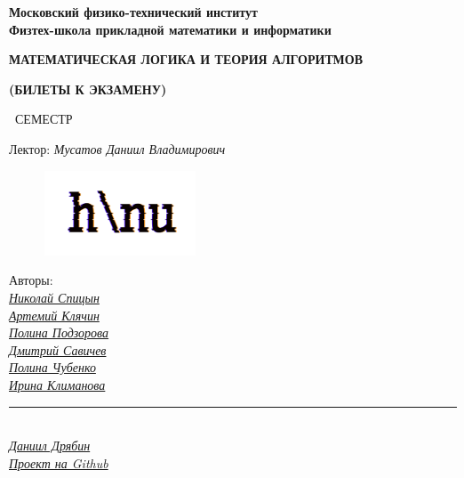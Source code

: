 
\newcommand{\GithubLink}{https://github.com/MIPT-Group/Lectures_Tex_Club}

\begin{titlepage}
	\clearpage\thispagestyle{empty}
	\centering
	
	
	\textbf{Московский физико-технический институт \\ Физтех-школа прикладной математики и информатики}
	\vspace{20ex}
	\vspace{13ex}
	
	{\textbf{{МАТЕМАТИЧЕСКАЯ ЛОГИКА И ТЕОРИЯ АЛГОРИТМОВ}}}

	{\textbf{(БИЛЕТЫ К ЭКЗАМЕНУ)}}
	
	\SemesterNumber\ СЕМЕСТР  
	\vspace{3ex}
	
	Лектор: \textit{Мусатов Даниил Владимирович}
	
	\begin{figure}[!ht]
		\centering
		\includegraphics[width=0.4\textwidth]{images/logo_ltc.png}
	\end{figure}

	\begin{flushright}
		\noindent
		Авторы: 
		\\
		\href{https://vk.com/spitsynn}{\textit{Николай Спицын}}
		\\
		\href{https://vk.com/id340504554}{\textit{Артемий Клячин}}
		\\
		\href{https://vk.com/id165779384}{\textit{Полина Подзорова}}
		\\
		\href{https://vk.com/dimasav123}{\textit{Дмитрий Савичев}}
		\\
		\href{https://vk.com/poli.dobro}{\textit{Полина Чубенко}}
		\\
		\href{https://vk.com/meraklim}{\textit{Ирина Климанова}}
		\\
		\rule{90pt}{0.5pt}
		\\
		\href{https://vk.com/ax_equals_b}{\textit{Даниил Дрябин}}
		\\
		\href{\GithubLink}{\textit{Проект на Github}}
	\end{flushright}
	
	\vfill
	\CourseDate
	\pagebreak
\end{titlepage}